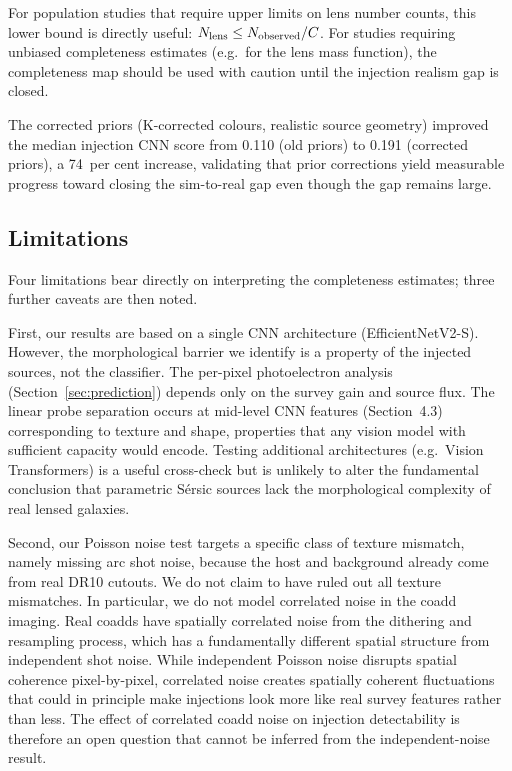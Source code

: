 \documentclass[fleqn,usenatbib]{rasti}
\begin{document}
For population studies that require upper limits on lens number counts, this lower bound is directly useful: $N_{\rm lens} \leq N_{\rm observed} / C$.  For studies requiring unbiased completeness estimates (e.g.\ for the lens mass function), the completeness map should be used with caution until the injection realism gap is closed.

The corrected priors (K-corrected colours, realistic source geometry) improved the median injection CNN score from 0.110 (old priors) to 0.191 (corrected priors), a 74~per cent increase, validating that prior corrections yield measurable progress toward closing the sim-to-real gap even though the gap remains large.

\subsection{Limitations}

Four limitations bear directly on interpreting the completeness estimates; three further caveats are then noted.

First, our results are based on a single CNN architecture (EfficientNetV2-S).  However, the morphological barrier we identify is a property of the injected sources, not the classifier.  The per-pixel photoelectron analysis (Section~\ref{sec:prediction}) depends only on the survey gain and source flux.  The linear probe separation occurs at mid-level CNN features (Section~4.3) corresponding to texture and shape, properties that any vision model with sufficient capacity would encode.  Testing additional architectures (e.g.\ Vision Transformers) is a useful cross-check but is unlikely to alter the fundamental conclusion that parametric S\'{e}rsic sources lack the morphological complexity of real lensed galaxies.

Second, our Poisson noise test targets a specific class of texture mismatch, namely missing arc shot noise, because the host and background already come from real DR10 cutouts.  We do not claim to have ruled out all texture mismatches.  In particular, we do not model correlated noise in the coadd imaging.  Real coadds have spatially correlated noise from the dithering and resampling process, which has a fundamentally different spatial structure from independent shot noise.  While independent Poisson noise disrupts spatial coherence pixel-by-pixel, correlated noise creates spatially coherent fluctuations that could in principle make injections look more like real survey features rather than less.  The effect of correlated coadd noise on injection detectability is therefore an open question that cannot be inferred from the independent-noise result.
\end{document}
